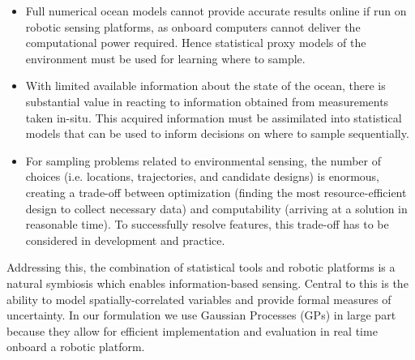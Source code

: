 \documentclass[aoas]{imsart}
\begin{document}
\begin{itemize}

\item Full numerical ocean models cannot provide accurate results
  online if run on robotic sensing platforms, as onboard computers
  cannot deliver the computational power required. Hence statistical
  proxy models of the environment must be used for learning where to sample.

\item With limited available information about the state of the ocean, there is substantial value in reacting to
  information obtained from measurements taken in-situ. This
  acquired information must be assimilated into statistical models that
  can be used to inform decisions on where to sample
  sequentially.%

\item For sampling problems related to environmental sensing, the
  number of choices (i.e. locations, trajectories, and candidate
  designs) is enormous, creating a
  trade-off between optimization (finding the most resource-efficient
  design to collect necessary data) and computability (arriving at a
  solution in reasonable time). To successfully resolve features, this
  trade-off has to be considered in development and practice.

\end{itemize}

Addressing this, the combination of statistical tools and robotic platforms is a
natural symbiosis which enables information-based sensing. Central to
this is the ability to model spatially-correlated variables and
provide formal measures of uncertainty. In our formulation we use
Gaussian Processes (GPs) in large part because they allow for
efficient implementation and evaluation in real time onboard a robotic platform.


\end{document}
